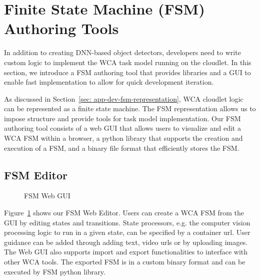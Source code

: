 \section{Finite State Machine (FSM) Authoring Tools}
\label{sec: app-dev-fsm}

In addition to creating DNN-based object detectors, developers need to write
custom logic to implement the WCA task model running on the cloudlet. In this
section, we introduce a FSM authoring tool that provides libraries and a GUI to
enable fast implementation to allow for quick development iteration.

As discussed in Section~\ref{sec: app-dev-fsm-representation}, WCA cloudlet
logic can be represented as a finite state machine. The FSM representation
allows us to impose structure and provide tools for task model implementation.
Our FSM authoring tool consists of a web GUI that allows users to visualize and
edit a WCA FSM within a browser, a python library that supports the creation and
execution of a FSM, and a binary file format that efficiently stores the FSM.

\subsection{FSM Editor}

\begin{figure}
    \centering
	\caption{FSM Web GUI}
    \label{figs:fsm-web-gui}
\end{figure}

Figure~\ref{figs:fsm-web-gui} shows our FSM Web Editor. Users can create a WCA
FSM from the GUI by editing states and transitions. State processors, e.g. the
computer vision processing logic to run in a given state, can be specified by a
container url. User guidance can be added through adding text, video urls or by
uploading images. The Web GUI also supports import and export functionalities to
interface with other WCA tools. The exported FSM is in a custom binary format
and can be executed by FSM python library.

